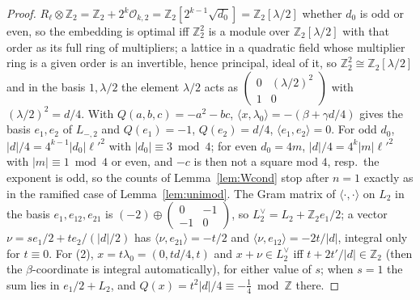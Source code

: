 \documentclass[11pt,reqno]{amsart}
\theoremstyle{plain}
\theoremstyle{definition}
\newcommand{\Z}{\mathbb{Z}}
\begin{document}
\begin{proof}
$R_\ell\otimes\Z_2=\Z_2+2^k\mathcal O_{k,2}=\Z_2[2^{k-1}\sqrt{d_0}]=\Z_2[\lambda/2]$ whether $d_0$ is
odd or even, so the embedding is optimal iff $\Z_2^2$ is a module over $\Z_2[\lambda/2]$ with that
order as its full ring of multipliers; a lattice in a quadratic field whose multiplier ring is a
given order is an invertible, hence principal, ideal of it, so $\Z_2^2\cong\Z_2[\lambda/2]$ and in
the basis $1,\lambda/2$ the element $\lambda/2$ acts as $\begin{pmatrix}0&(\lambda/2)^2\\1&0
\end{pmatrix}$ with $(\lambda/2)^2=d/4$. With $Q(a,b,c)=-a^2-bc$, $\langle x,\lambda_0\rangle=
-(\beta+\gamma d/4)$ gives the basis $e_1,e_2$ of $L_{-,2}$ and $Q(e_1)=-1$, $Q(e_2)=d/4$,
$\langle e_1,e_2\rangle=0$. For odd $d_0$, $\lvert d\rvert/4=4^{k-1}\lvert d_0\rvert \ell'^2$ with
$\lvert d_0\rvert\equiv3\bmod4$; for even $d_0=4m$, $\lvert d\rvert/4=4^k\lvert m\rvert \ell'^2$ with
$\lvert m\rvert\equiv1\bmod4$ or even, and $-c$ is then not a square mod $4$, resp.\ the exponent
is odd, so the counts of Lemma~\ref{lem:Wcond} stop after $n=1$ exactly as in the ramified case
of Lemma~\ref{lem:unimod}. The Gram matrix of $\langle\cdot,\cdot\rangle$ on $L_2$ in the basis
$e_1,e_{12},e_{21}$ is $(-2)\oplus\begin{pmatrix}0&-1\\-1&0\end{pmatrix}$, so $L_2^\vee=L_2+\Z_2
e_1/2$; a vector $\nu=se_1/2+te_2/(\lvert d\rvert/2)$ has $\langle\nu,e_{21}\rangle=-t/2$ and
$\langle\nu,e_{12}\rangle=-2t/\lvert d\rvert$, integral only for $t\equiv0$. For (2), $x=t\lambda_0
=(0,td/4,t)$ and $x+\nu\in L_2^\vee$ iff $t+2t'/\lvert d\rvert\in\Z_2$ (then the $\beta$-coordinate
is integral automatically), for either value of $s$; when $s=1$ the sum lies in $e_1/2+L_2$, and
$Q(x)=t^2\lvert d\rvert/4\equiv-\tfrac14\bmod\Z$ there.
\end{proof}
\end{document}
